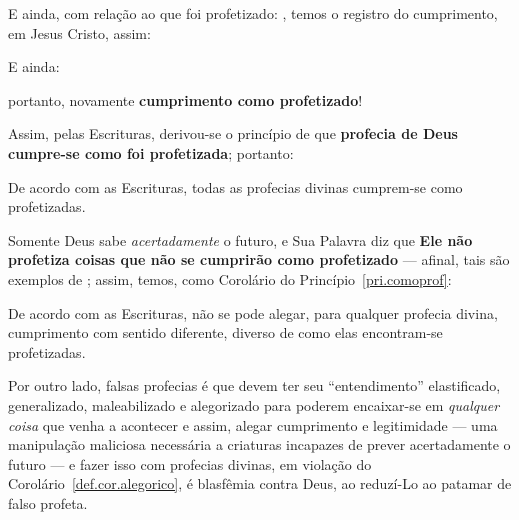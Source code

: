     E ainda, com relação ao que foi profetizado: ,  temos  o  registro  do
    cumprimento, em Jesus Cristo, assim:


    E ainda:


    \noindent portanto, novamente \textbf{cumprimento como profetizado}!

    Assim, pelas Escrituras, derivou-se o princípio de que \textbf{profecia de Deus cumpre-se como foi profetizada}; portanto:

    \begin{PRI}
        \label{pri.comoprof}
        De acordo com as Escrituras, todas as profecias divinas cumprem-se como profetizadas.
    \end{PRI}

    Somente Deus sabe \emph{acertadamente} o futuro, e Sua Palavra diz que \textbf{Ele não profetiza coisas que não se cumprirão
    como profetizado} --- afinal, tais são exemplos de ; assim, temos, como
    Corolário do Princípio~\ref{pri.comoprof}:

    \begin{COR}
        \label{def.cor.alegorico}
        De acordo com as Escrituras, não se pode alegar, para qualquer  profecia  divina,  cumprimento  com  sentido
        diferente, diverso de como elas en\-con\-tram-se profetizadas.
    \end{COR}

    Por outro lado, falsas  profecias  é  que  devem  ter  seu  ``entendimento''  elastificado,  generalizado,  maleabilizado  e
    alegorizado para poderem encaixar-se em  \emph{qualquer  coisa}  que  venha  a  acontecer  e  assim,  alegar  cumprimento  e
    legitimidade --- uma manipulação maliciosa necessária a criaturas incapazes de prever acertadamente o  futuro  ---  e  fazer
    isso com profecias divinas, em violação do Corolário~\ref{def.cor.alegorico}, é  blasfêmia  contra  Deus,  ao  reduzí-Lo  ao
    patamar de falso profeta.


